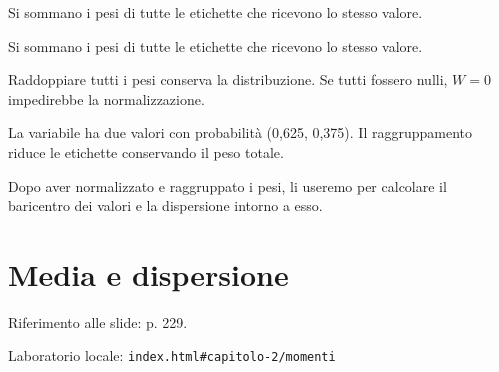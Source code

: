 
Si sommano i pesi di tutte le etichette che ricevono lo stesso valore.\par


\label{c2-distribuzioni-example-2-step-4}


Si sommano i pesi di tutte le etichette che ricevono lo stesso valore.\par


\label{c2-distribuzioni-example-2-step-5}


Raddoppiare tutti i pesi conserva la distribuzione. Se tutti fossero nulli, \(W=0\) impedirebbe la normalizzazione.\par



La variabile ha due valori con probabilità (0,625, 0,375). Il raggruppamento riduce le etichette conservando il peso totale.\par


Dopo aver normalizzato e raggruppato i pesi, li useremo per calcolare il baricentro dei valori e la dispersione intorno a esso.\par


\Needspace{.43\textheight}
\section{Media e dispersione}
\label{c2-momenti}

{\sffamily\small\color{Ink!70} Riferimento alle slide: p. 229.\par}

{\sffamily\small\color{Ink!70} Laboratorio locale: \nolinkurl{index.html#capitolo-2/momenti}\par}

